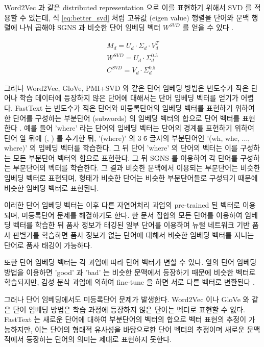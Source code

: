 \documentclass[11pt]{article}
\begin{document}
Word2Vec 과 같은 distributed representation 으로 이를 표현하기 위해서 SVD 를 적용할 수 있는데, 식 \ref{eq:better_svd} 처럼 고유값 (eigen value) 행렬을 단어와 문맥 행렬에 나눠 곱해야 SGNS 과 비슷한 단어 임베딩 벡터 $W^{SVD}$ 를 얻을 수 있다 \citep{levy2015improving}.

\begin{equation}
  \label{eq:better_svd}
  \begin{aligned}
  M_d = U_d \cdot \Sigma_d \cdot V_d^T \\
  W^{SVD} = U_d \cdot \Sigma_d^{0.5} \\
  C^{SVD} = V_d \cdot \Sigma_d^{0.5}
  \end{aligned}
\end{equation}


그러나 Word2Vec, GloVe, PMI+SVD 와 같은 단어 임베딩 방법은 빈도수가 작은 단어나 학습 데이터에 등장하지 않은 단어에 대해서는 단어 임베딩 벡터를 얻기가 어렵다.
FastText 는 빈도수가 적은 단어와 미등록단어의 임베딩 벡터를 표현하기 위하여 한 단어를 구성하는 부분단어 (subwords) 의 임베딩 벡터의 합으로 단어 벡터를 표현한다 \citep{bojanowski2017enriching}.
예를 들어 'where' 라는 단어의 임베딩 벡터는 단어의 경계를 표현하기 위하여 단어 앞 뒤에 (, ) 를 추가한 뒤, '(where)' 의 3 \~ 6 글자의 부분단어인 '(wh, whe, ..., where)' 의 임베딩 벡터를 학습한다.
그 뒤 단어 'where' 의 단어의 벡터는 이를 구성하는 모든 부분단어 벡터의 합으로 표현한다.
그 뒤 SGNS 를 이용하여 각 단어를 구성하는 부분단어의 벡터를 학습한다.
그 결과 비슷한 문맥에서 이용되는 부분단어는 비슷한 임베딩 벡터로 표현되며, 형태가 비슷한 단어는 비슷한 부분단어들로 구성되기 때문에 비슷한 임베딩 벡터로 표현된다.

이러한 단어 임베딩 벡터는 이후 다른 자연어처리 과업의 pre-trained 된 벡터로 이용되며, 미등록단어 문제를 해결하기도 한다.
한 문서 집합의 모든 단어를 이용하여 임베딩 벡터를 학습한 뒤 품사 정보가 태깅된 일부 단어를 이용하여 뉴럴 네트워크 기반 품사 판별기를 학습하면 품사 정보가 없는 단어에 대해서 비슷한 임베딩 벡터를 지니는 단어로 품사 태깅이 가능하다.

또한 단어 임베딩 벡터는 각 과업에 따라 단어 벡터가 변할 수 있다.
앞의 단어 임베딩 방법을 이용하면 'good' 과 'bad' 는 비슷한 문맥에서 등장하기 때문에 비슷한 벡터로 학습되지만, 감성 분삭 과업에 의하여 fine-tune 을 하면 서로 다른 벡터로 변환된다 \citep{kim2014convolutional, joulin2016bag}.

그러나 단어 임베딩에서도 미등록단어 문제가 발생한다.
Word2Vec 이나 GloVe 와 같은 단어 임베딩 방법은 학습 과정에 등장하지 않은 단어는 벡터로 표현할 수 없다.
FastText 는 새로운 단어에 대하여 부분단어의 벡터의 합으로 벡터 표현의 추정이 가능하지만, 이는 단어의 형태적 유사성을 바탕으로한 단어 벡터의 추정이며 새로운 문맥적에서 등장하는 단어의 의미는 제대로 표현하지 못한다.
\end{document}
